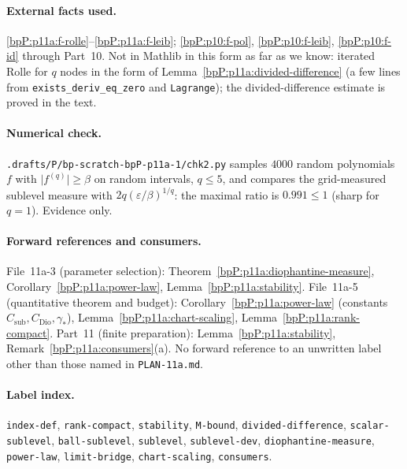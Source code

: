 \paragraph{External facts used.} \ref{bpP:p11a:f-rolle}--\ref{bpP:p11a:f-leib}; \ref{bpP:p10:f-pol}, \ref{bpP:p10:f-leib}, \ref{bpP:p10:f-id} through Part~10. Not in Mathlib in this form as far as we know: iterated Rolle for $q$ nodes in the form of Lemma~\ref{bpP:p11a:divided-difference} (a few lines from \texttt{exists\_deriv\_eq\_zero} and \texttt{Lagrange}); the divided-difference estimate is proved in the text.

\paragraph{Numerical check.} \texttt{.drafts/P/bp-scratch-bpP-p11a-1/chk2.py} samples $4000$ random polynomials $f$ with $\lvert f^{(q)}\rvert\ge\beta$ on random intervals, $q\le5$, and compares the grid-measured sublevel measure with $2q(\varepsilon/\beta)^{1/q}$: the maximal ratio is $0.991\le1$ (sharp for $q=1$). Evidence only.

\paragraph{Forward references and consumers.} File~11a-3 (parameter selection): Theorem~\ref{bpP:p11a:diophantine-measure}, Corollary~\ref{bpP:p11a:power-law}, Lemma~\ref{bpP:p11a:stability}. File~11a-5 (quantitative theorem and budget): Corollary~\ref{bpP:p11a:power-law} (constants $C_{\mathrm{sub}},C_{\mathrm{Dio}},\gamma_*$), Lemma~\ref{bpP:p11a:chart-scaling}, Lemma~\ref{bpP:p11a:rank-compact}. Part~11 (finite preparation): Lemma~\ref{bpP:p11a:stability}, Remark~\ref{bpP:p11a:consumers}(a). No forward reference to an unwritten label other than those named in \texttt{PLAN-11a.md}.

\paragraph{Label index.} \texttt{index-def}, \texttt{rank-compact}, \texttt{stability}, \texttt{M-bound}, \texttt{divided-difference}, \texttt{scalar-sublevel}, \texttt{ball-sublevel}, \texttt{sublevel}, \texttt{sublevel-dev}, \texttt{diophantine-measure}, \texttt{power-law}, \texttt{limit-bridge}, \texttt{chart-scaling}, \texttt{consumers}.
\par\endgroup
